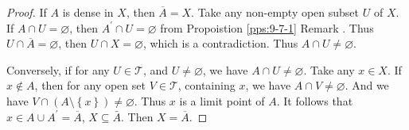\documentclass[../main.tex]{subfiles}
\begin{document}
\begin{proof}
    If \(  A  \) is dense in \(  X  \), then \(  \overline{A}= X  \).    Take any non-empty  open subset \(  U  \) of \(  X  \). If \(  A\cap U= \varnothing  \), then \(  A^{\prime} \cap U= \varnothing  \) from Propoistion \ref{pps:9-7-1} Remark .       Thus \(  U\cap  \overline{A}= \varnothing  \), then \(  U\cap X= \varnothing  \), which is a contradiction. Thus \(  A\cap U\neq \varnothing  \).
    
    Conversely,  if for any \(  U\in \mathcal{T}  \), and \(  U\neq \varnothing  \), we have \(  A\cap U\neq \varnothing  \). Take any \(  x \in X  \). If \(  x \not \in A  \), then for any   open set \(  V\in \mathcal{T}  \), containing \(  x  \), we have \(  A\cap V\neq \varnothing  \). And we have \(  V\cap \left( A\setminus \left\{ x \right\} \right)\neq \varnothing   \). Thus  \(  x  \) is a limit point of \(  A  \). It follows that \(  x \in A\cup A^{\prime} = \overline{A}  \), \(  X\subseteq \bar{A}  \). Then \(  X= \overline{A}  \).            
\end{proof}
\end{document}
